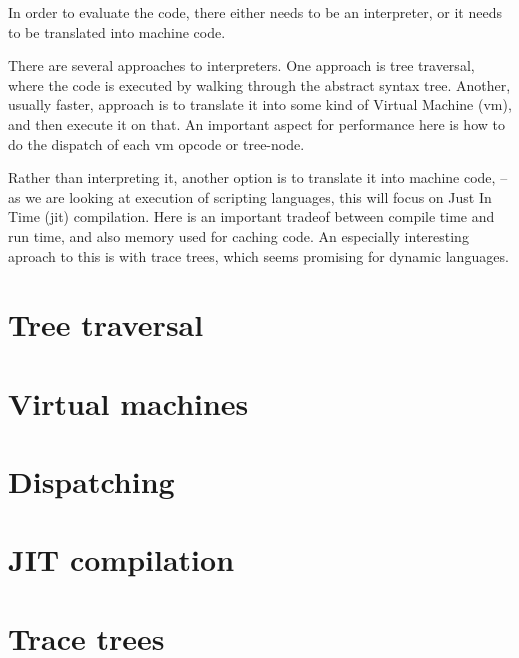 In order to evaluate the code, there either needs to be an interpreter, or it needs to be translated into machine code. 

There are several approaches to interpreters.
One approach is tree traversal, where the code is executed by walking through the abstract syntax tree. 
Another, usually faster, approach is to translate it into some kind of Virtual Machine (vm), and then execute it on that.
An important aspect for performance  here is how to do the dispatch of each vm opcode or tree-node.

Rather than interpreting it, another option is to translate it into machine code, -- as we are looking at execution of scripting languages, this will focus on Just In Time (jit) compilation. Here is an important tradeof between compile time and run time, and also memory used for caching code.
An especially interesting aproach to this is with trace trees, which seems promising for dynamic languages.

\section{Tree traversal}
\section{Virtual machines}
\section{Dispatching}
\section{JIT compilation}
\section{Trace trees}
